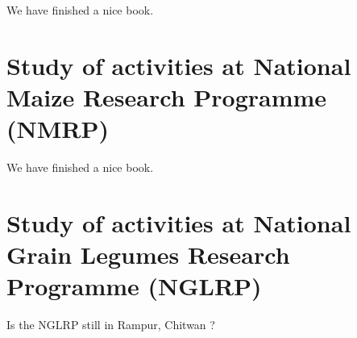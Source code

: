 \documentclass[]{book}
\begin{document}
We have finished a nice book.

\hypertarget{practical-8}{%
\chapter{Study of activities at National Maize Research Programme (NMRP)}\label{practical-8}}

We have finished a nice book.

\hypertarget{practical-9}{%
\chapter{Study of activities at National Grain Legumes Research Programme (NGLRP)}\label{practical-9}}

Is the NGLRP still in Rampur, Chitwan ?


\end{document}
